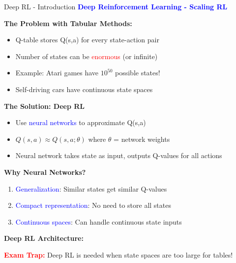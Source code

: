 \documentclass[8pt]{beamer}
\begin{document}
\begin{frame}{Deep RL - Introduction}
\fontsize{6.5}{7.5}\selectfont
\textcolor{blue}{\textbf{Deep Reinforcement Learning - Scaling RL}}

\textbf{The Problem with Tabular Methods:}
\begin{itemize}
\item Q-table stores Q(s,a) for every state-action pair
\item Number of states can be \textcolor{red}{enormous} (or infinite)
\item Example: Atari games have $10^{50}$ possible states!
\item Self-driving cars have continuous state spaces
\end{itemize}

\textbf{The Solution: Deep RL}
\begin{itemize}
\item Use \textcolor{blue}{neural networks} to approximate Q(s,a)
\item $Q(s,a) \approx Q(s,a; \theta)$ where $\theta$ = network weights
\item Neural network takes state as input, outputs Q-values for all actions
\end{itemize}

\textbf{Why Neural Networks?}
\begin{enumerate}
\item \textcolor{blue}{Generalization}: Similar states get similar Q-values
\item \textcolor{blue}{Compact representation}: No need to store all states
\item \textcolor{blue}{Continuous spaces}: Can handle continuous state inputs
\end{enumerate}

\textbf{Deep RL Architecture:}
\begin{center}
\end{center}

\textcolor{red}{\textbf{Exam Trap:}} Deep RL is needed when state spaces are too large for tables!
\end{frame}
\end{document}
